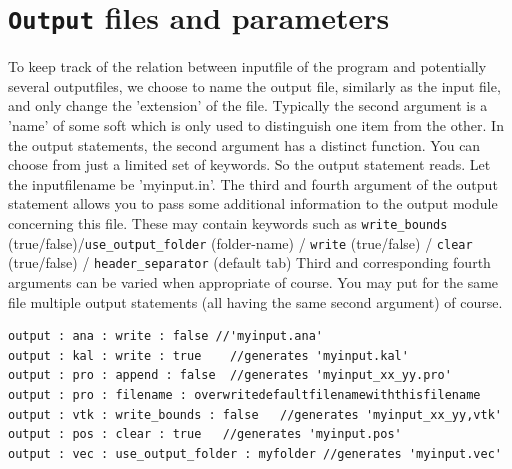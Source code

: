 \documentclass{article}
\begin{document}
\section{{\tt Output} files and parameters}
\label{sec:output}
To keep track of the relation between inputfile of the program and potentially several outputfiles, we choose to name the output file, similarly as the input file, and only change the 'extension' of the file. Typically the second argument is a 'name' of some soft which is only used to distinguish one item from the other. In the output statements, the second argument has a distinct function. You can choose from  just a limited set of keywords. So the output statement reads. Let the inputfilename be 'myinput.in'. The third and fourth argument of the output statement allows you to pass some additional information to the output module concerning this file. These may contain keywords such as  
{\tt write\_bounds} (true/false)/{\tt use\_output\_folder} (folder-name) / {\tt write} (true/false) / {\tt clear} (true/false) / {\tt header\_separator} (default tab) Third and corresponding fourth arguments can be varied when appropriate of course. You may put for the same file multiple output statements (all having the same second argument) of course.

\begin{verbatim}
output : ana : write : false //'myinput.ana'
output : kal : write : true    //generates 'myinput.kal'
output : pro : append : false  //generates 'myinput_xx_yy.pro'
output : pro : filename : overwritedefaultfilenamewiththisfilename
output : vtk : write_bounds : false   //generates 'myinput_xx_yy,vtk'
output : pos : clear : true   //generates 'myinput.pos'
output : vec : use_output_folder : myfolder //generates 'myinput.vec'
\end{verbatim}
\end{document}
